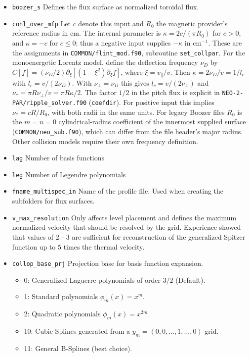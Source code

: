 \documentclass{article}
\begin{document}
\begin{itemize}
 \item \verb|boozer_s| \newline
 Defines the flux surface as normalized toroidal flux.
 \item \verb|conl_over_mfp|\newline
 Let $c$ denote this input and $R_0$ the magnetic provider's reference
 radius in cm. The internal parameter is
 $\kappa=2c/(\pi R_0)$ for $c>0$, and $\kappa=-c$ for $c\leq0$;
 thus a negative input supplies $-\kappa$ in $\mathrm{cm}^{-1}$.
 These are the assignments in \texttt{COMMON/flint\_mod.f90},
 subroutine \texttt{set\_collpar}.
 For the monoenergetic Lorentz model, define the deflection frequency
 $\nu_D$ by $C[f]=(\nu_D/2)\partial_\xi[(1-\xi^2)\partial_\xi f]$,
 where $\xi=v_\parallel/v$. Then $\kappa=2\nu_D/v=1/l_c$ with
 $l_c=v/(2\nu_D)$. With $\nu_\perp=\nu_D$ this
 gives $l_c=v/(2\nu_\perp)$ and $\nu_*=\pi R\nu_\perp/v=\pi R\kappa/2$.
 The factor $1/2$ in the pitch flux is explicit in
 \texttt{NEO-2-PAR/ripple\_solver.f90} (\texttt{coefdir}).
 For positive input this implies $\nu_*=cR/R_0$, with both radii
 in the same units. For legacy Boozer files $R_0$ is the $m=n=0$
 cylindrical-radius coefficient of the innermost supplied surface
 (\texttt{COMMON/neo\_sub.f90}), which can differ from the file header's
 major radius. Other collision models require their own frequency definition.
 \item \verb|lag|\newline
 Number of basis functions
 \item \verb|leg|\newline
 Number of Legendre polynomials
 \item \verb|fname_multispec_in|
 Name of the profile file. Used when creating the subfolders for flux
 surfaces.
 \item \verb|v_max_resolution|\newline
 Only affects level placement and defines the maximum normalized
 velocity that should be resolved by the grid. Experience showed that
 values of $2$ - $3$ are sufficient for reconstruction of the
 generalized Spitzer function up to $5$ times the thermal velocity.
 \item \verb|collop_base_prj|\newline
 Projection base for basis function expansion.
 \begin{itemize}
  \item 0: Generalized Laguerre polynomials of order $3/2$ (Default).
  \item 1: Standard polynomials $\phi_m(x) = x^m$.
  \item 2: Quadratic polynomials $\phi_m(x) = x^{2m}$.
  \item 10: Cubic Splines generated from a $y_m = (0, 0, ..., 1, ..., 0)$ grid.
  \item 11: General B-Splines (best choice).
 \end{itemize}


\end{itemize}
\end{document}
